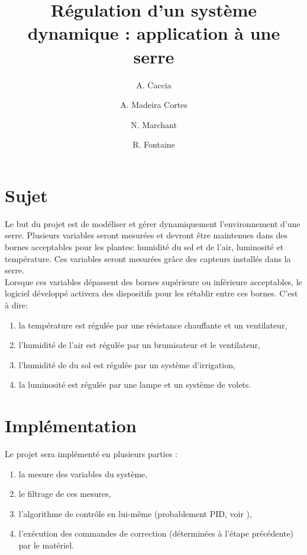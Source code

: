 \documentclass[a4paper,10pt]{article}
\title{Régulation d'un système dynamique : application à une serre}
\author{A. Caccia \and A. Madeira Cortes \and N. Marchant \and R. Fontaine}
\date{ }
\begin{document}
\maketitle

\vspace{1cm}

\section{Sujet}

Le but du projet est de modéliser et gérer dynamiquement l'environnement d'une serre. Plusieurs variables seront mesurées et devront être maintenues dans des bornes acceptables pour les plantes: humidité du sol et de l'air, luminosité et température. Ces variables seront mesurées grâce des capteurs installés dans la serre. \\

Lorsque ces variables dépassent des bornes supérieure ou inférieure acceptables, le logiciel développé activera des dispositifs pour les rétablir entre ces bornes. C'est à dire: \\

\begin{enumerate}
	\item la température est régulée par une résistance chauffante et un ventilateur,
	\item l'humidité de l'air est régulée par un brumisateur et le ventilateur,
	\item l'humidité de du sol est régulée par un système d'irrigation,
	\item la luminosité est régulée par une lampe et un système de volets.\\
\end{enumerate}

\newpage

\section{Implémentation}

Le projet sera implémenté en plusieurs parties :

\begin{enumerate}
    \item la mesure des variables du système,
    \item le filtrage de ces mesures,
    \item l'algorithme de contrôle en lui-même (probablement PID, voir \cite{Kinnaert2013}),
    \item l'exécution des commandes de correction (déterminées à l'étape précédente) par le matériel.
\end{enumerate}
\end{document}
